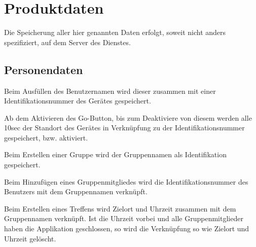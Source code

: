 \section{Produktdaten}

Die Speicherung aller hier genannten Daten erfolgt, soweit nicht anders spezifiziert, auf dem Server des Dienstes.

\subsection{Personendaten}
Beim Ausfüllen des Benutzernamen wird dieser zusammen mit einer Identifikationsnummer des Gerätes gespeichert.

Ab dem Aktivieren des Go-Button, bis zum Deaktiviere von diesem werden alle 10sec der Standort des Gerätes in Verknüpfung zu der Identifikationsnummer gespeichert, bzw. aktiviert.

Beim Erstellen einer Gruppe wird der Gruppennamen als Identifikation gespeichert.

Beim Hinzufügen eines Gruppenmitgliedes wird die Identifikationsnummer des Benutzers mit dem Gruppennamen verknüpft.

Beim Erstellen eines Treffens wird Zielort und Uhrzeit zusammen mit dem Gruppennamen verknüpft. Ist die Uhrzeit vorbei und alle Gruppenmitglieder haben die Applikation geschlossen, so wird die Verknüpfung so wie Zielort und Uhrzeit gelöscht.
